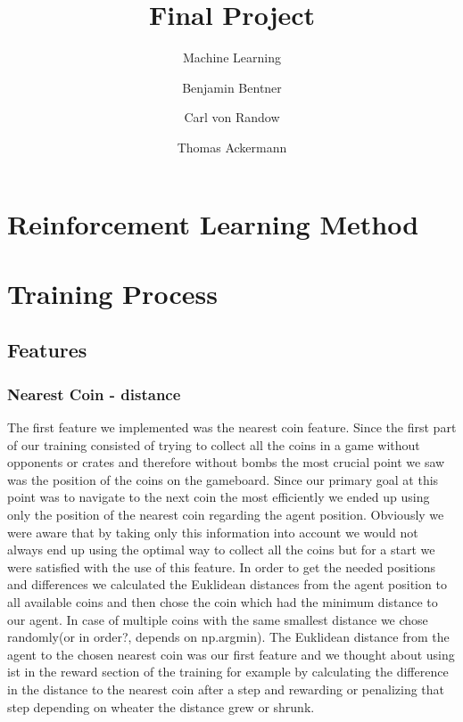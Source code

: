 \documentclass[12pt, a4paper, bibliography=totoc]{scrreprt}
\title{Final Project}
\subtitle{Machine Learning}
\author{Benjamin Bentner \and Carl von Randow \and Thomas Ackermann}
\begin{document}
\maketitle
\tableofcontents

\chapter{Reinforcement Learning Method}

\chapter{Training Process}

\section{Features}
\subsection{Nearest Coin - distance}
The first feature we implemented was the nearest coin feature. Since the first part of our training consisted of trying to collect all the coins in a game without opponents or crates and therefore without bombs the most crucial point we saw was the position of the coins on the gameboard. Since our primary goal at this point was to navigate to the next coin the most efficiently we ended up using only the position of the nearest coin regarding the agent position. Obviously we were aware that by taking only this information into account we would not always end up using the optimal way to collect all the coins but for a start we were satisfied with the use of this feature. In order to get the needed positions and differences we calculated the Euklidean distances from the agent position to all available coins and then chose the coin which had the minimum distance to our agent. In case of multiple coins with the same smallest distance we chose randomly(or in order?, depends on np.argmin). The Euklidean distance from the agent to the chosen nearest coin was our first feature and we thought about using ist in the reward section of the training for example by calculating the difference in the distance to the nearest coin after a step and rewarding or penalizing that step depending on wheater the distance grew or shrunk. 
\end{document}

